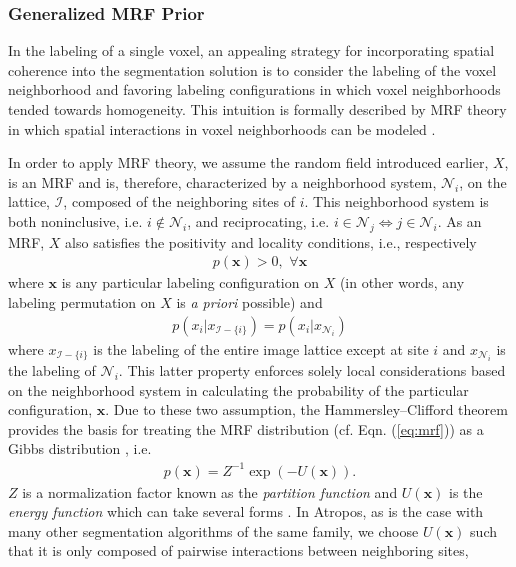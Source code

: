 \documentclass[11pt,english]{article}
\begin{document}
\subsubsection{Generalized MRF Prior}
In the labeling of a single voxel, an appealing strategy for incorporating spatial coherence into the segmentation solution is to consider the labeling of the voxel neighborhood and favoring labeling configurations in which voxel neighborhoods tended towards homogeneity. This intuition is formally described by MRF theory in which spatial interactions in voxel neighborhoods can be modeled \citep{Li2001}.

In order to apply MRF theory,  we assume the random field introduced earlier, $X$, is an MRF and is, therefore, characterized by a neighborhood system, $\mathcal{N}_i$, on the lattice, $\mathcal{I}$, composed of the neighboring sites of $i$.  This neighborhood system is both noninclusive, i.e. $i \notin \mathcal{N}_i$, and reciprocating, i.e. $i \in \mathcal{N}_j \Leftrightarrow j \in \mathcal{N}_i$.   As an MRF, $X$ also satisfies the positivity and locality conditions, i.e., respectively
\begin{align} \label{eq:mrf}
  p(\mathbf{x}) > 0, \,\, \forall\mathbf{x}
\end{align}
where $\mathbf{x}$ is any particular labeling configuration on $X$ (in other words, any labeling permutation on $X$ is {\em a priori} possible) and 
\begin{align}
  p\left(x_i | x_{\mathcal{I}-\{i\}}\right) = p\left(x_i | x_{\mathcal{N}_i}\right)
\end{align}
where $x_{\mathcal{I}-\{i\}}$ is the labeling of the entire image lattice except at site $i$ and  $x_{\mathcal{N}_i}$ is the labeling of $\mathcal{N}_i$.  This latter property enforces solely local considerations based on the neighborhood system in calculating the probability of the particular configuration, $\mathbf{x}$.  Due to these two assumption, the Hammersley--Clifford theorem provides the basis for treating the MRF distribution (cf. Eqn. (\ref{eq:mrf})) as a Gibbs distribution \citep{Besag1974,Geman1984}, i.e.
\begin{align} \label{eq:gibbs}
p(\mathbf{x}) = Z^{-1} \exp\left(-U(\mathbf{x})\right).
\end{align}
$Z$ is a normalization factor known as the {\em partition function} and $U(\mathbf{x})$ is the {\em energy function} which can take several forms \citep{Li2001}. In Atropos, as is the case with many other segmentation algorithms of the same family, we choose $U(\mathbf{x})$ such that it is only composed of pairwise interactions between neighboring sites,%
\end{document}
